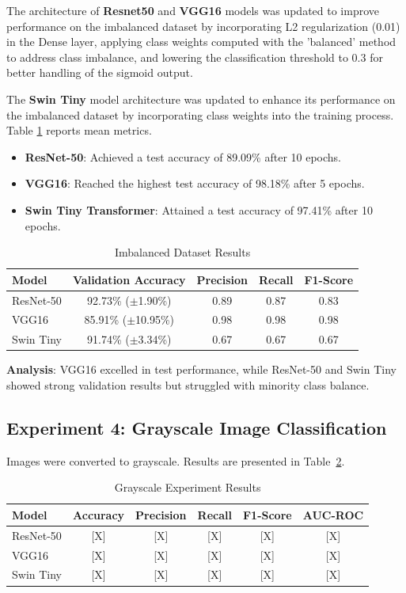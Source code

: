 \documentclass[12pt, a4paper]{article}
\begin{document}
The architecture of \textbf{Resnet50} and \textbf{VGG16} models was updated to improve performance on the imbalanced dataset by incorporating L2 regularization (0.01) in the Dense layer, applying class weights computed with the 'balanced' method to address class imbalance, and lowering the classification threshold to 0.3 for better handling of the sigmoid output.

The \textbf{Swin Tiny} model architecture was updated to enhance its performance on the imbalanced dataset by incorporating class weights into the training process.
Table \ref{tab:imbalanced} reports mean metrics.
\begin{itemize}
\item \textbf{ResNet-50}: Achieved a test accuracy of 89.09\% after 10 epochs.
\item \textbf{VGG16}: Reached the highest test accuracy of 98.18\% after 5 epochs.
\item \textbf{Swin Tiny Transformer}: Attained a test accuracy of 97.41\% after 10 epochs.  
\end{itemize}

\begin{table}[h]
    \centering
    \caption{Imbalanced Dataset Results}
    \label{tab:imbalanced}
    \begin{tabular}{lcccc}
        \toprule
        Model & Validation Accuracy & Precision & Recall & F1-Score \\
        \midrule
        ResNet-50 & 92.73\% ($\pm$1.90\%) & 0.89 & 0.87 & 0.83 \\
        VGG16 & 85.91\% ($\pm$10.95\%) & 0.98 & 0.98 & 0.98 \\
        Swin Tiny & 91.74\% ($\pm$3.34\%) & 0.67 & 0.67 & 0.67 \\
        \bottomrule
    \end{tabular}
\end{table}

\textbf{Analysis}: VGG16 excelled in test performance, while ResNet-50 and Swin Tiny showed strong validation results but struggled with minority class balance.


\subsection{Experiment 4: Grayscale Image Classification}
Images were converted to grayscale. Results are presented in Table~\ref{tab:grayscale}.

\begin{table}[h]
    \centering
    \caption{Grayscale Experiment Results}
    \label{tab:grayscale}
    \begin{tabular}{lccccc}
        \toprule
        Model & Accuracy & Precision & Recall & F1-Score & AUC-ROC \\
        \midrule
        ResNet-50 & [X] & [X] & [X] & [X] & [X] \\
        VGG16 & [X] & [X] & [X] & [X] & [X] \\
        Swin Tiny & [X] & [X] & [X] & [X] & [X] \\
        \bottomrule
    \end{tabular}
\end{table}
\end{document}
